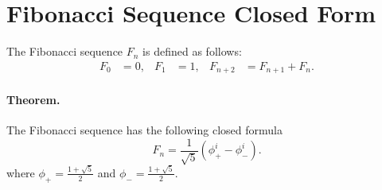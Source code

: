 \documentclass{article}
\begin{document}
\section*{Fibonacci Sequence Closed Form}

The Fibonacci sequence $F_n$ is defined as follows:
\begin{align*}
  F_0 &= 0, &
  F_1 &= 1, &
  F_{n+2} &= F_{n+1} + F_n.
\end{align*}

\paragraph{Theorem.}
The Fibonacci sequence has the following closed formula
\[
  F_n
  =
  \frac{1}{\sqrt{5}} \left(\phi_+^i - \phi_-^i\right).
\]
where
$\phi_+ = \frac{1 + \sqrt{5}}{2}$ and
$\phi_- = \frac{1 + \sqrt{5}}{2}$.
\end{document}
